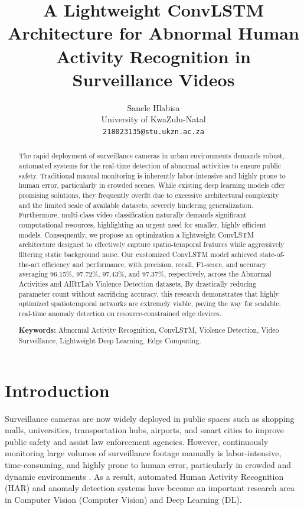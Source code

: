 \documentclass[11pt,a4paper]{article}
\title{
    A Lightweight ConvLSTM Architecture for Abnormal Human Activity Recognition
    in Surveillance Videos
}
\author{Sanele Hlabisa \\
University of KwaZulu-Natal \\
\texttt{218023135@stu.ukzn.ac.za}}
\date{}
\begin{document}
	\maketitle

	\begin{abstract}
		The rapid deployment of surveillance cameras in urban environments demands
		robust, automated systems for the real-time detection of abnormal activities
		to ensure public safety. Traditional manual monitoring is inherently 
		labor-intensive and highly prone to human error, particularly in crowded 
		scenes. While existing deep learning models offer promising solutions, 
		they frequently overfit due to excessive architectural complexity and 
		the limited scale of available datasets, severely hindering generalization. 
		Furthermore, multi-class video classification naturally demands significant
		computational resources, highlighting an urgent need for smaller, highly 
		efficient models. Consequently, we propose an optimization a lightweight
		ConvLSTM architecture designed to effectively capture spatio-temporal
		features while aggressively filtering static background noise. Our customized
		ConvLSTM model achieved state-of-the-art efficiency and performance, with
		precision, recall, F1-score, and accuracy averaging 96.15\%, 97.72\%, 97.43\%,
		and 97.37\%, respectively, across the Abnormal Activities and AIRTLab Violence
		Detection datasets. By drastically reducing parameter count without sacrificing
		accuracy, this research demonstrates that highly optimized spatiotemporal 
		networks are extremely viable, paving the way for scalable, real-time anomaly
		detection on resource-constrained edge devices.
		\par\medskip
		\noindent \textbf{Keywords:} Abnormal Activity Recognition, ConvLSTM, Violence 
		Detection, Video Surveillance, Lightweight Deep Learning, Edge Computing.
	\end{abstract}

	\section{Introduction}

	Surveillance cameras are now widely deployed in public spaces such as shopping
	malls, universities, transportation hubs, airports, and smart cities to improve
	public safety and assist law enforcement agencies. However, continuously
	monitoring large volumes of surveillance footage manually is labor-intensive,
	time-consuming, and highly prone to human error, particularly in crowded and
	dynamic environments \cite{arshad2022, mohan2019}. As a result, automated Human
	Activity Recognition (HAR) and anomaly detection systems have become an
	important research area in Computer Vision (Computer Vision) and Deep Learning (DL).
\end{document}
